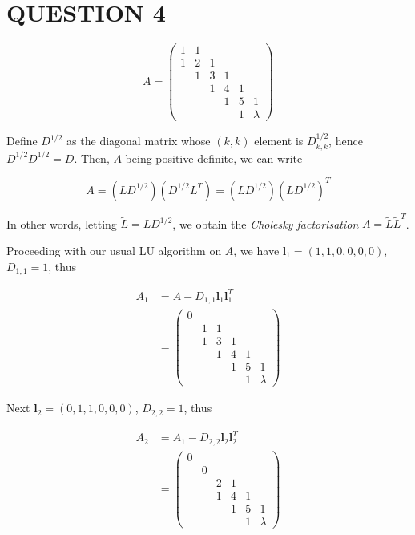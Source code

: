 \documentclass[a4paper]{article}
\begin{document}
\section{QUESTION 4}

\[ A = \begin{pmatrix}
1 & 1 & & & & \\
1 & 2 & 1 & & & \\
& 1 & 3 & 1 & & \\
& & 1 & 4 & 1 & \\
& & & 1 & 5 & 1 \\
& & & & 1 & \lambda
\end{pmatrix} \]

Define $ D^{1/2} $ as the diagonal matrix whose $ (k,k) $ element is $ D_{k,k}^{1/2} $, hence $ D^{1/2} D^{1/2}  =  D $. Then, $ A $ being positive definite, we can write

\[ A = (LD^{1/2})(D^{1/2} L^{T}) = ( L D^{1/2}) (  L D^{1/2} )^{T} \]

In other words, letting $ \tilde{L} = L D^{1/2} $, we obtain the \emph{Cholesky factorisation} $ A = \tilde{L} \tilde{L}^{T} $. 

Proceeding with our usual LU algorithm on $ A $, we have $ \mathbf{l}_{1} = (1,1,0,0,0,0) $, $ D_{1,1} = 1 $, thus

\begin{align*}
A_{1} & = A - D_{1,1} \mathbf{l}_{1} \mathbf{l}_{1}^{T} \\
& = \begin{pmatrix}
0 &  & & & & \\
 & 1 & 1 & & & \\
& 1 & 3 & 1 & & \\
& & 1 & 4 & 1 & \\
& & & 1 & 5 & 1 \\
& & & & 1 & \lambda
\end{pmatrix}
\end{align*} 

Next $ \mathbf{l}_{2} = (0,1,1,0,0,0) $, $ D_{2,2} = 1 $, thus

\begin{align*}
A_{2} & = A_{1} - D_{2,2} \mathbf{l}_{2} \mathbf{l}_{2}^{T} \\
& = \begin{pmatrix}
0 & & & & & \\
& 0 &  & & & \\
& & 2 & 1 & & \\
& & 1 & 4 & 1 & \\
& & & 1 & 5 & 1 \\
& & & & 1 & \lambda
\end{pmatrix}
\end{align*} 
\end{document}
